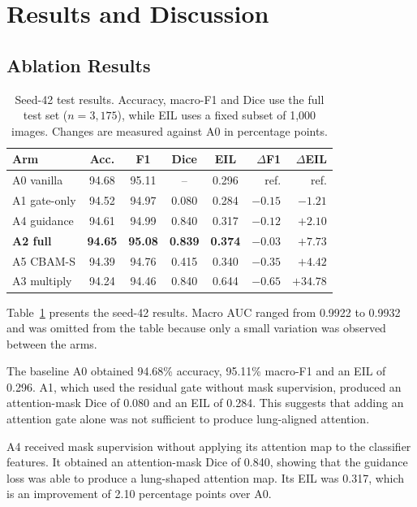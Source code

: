 \documentclass[sigconf,screen,nonacm]{acmart}
\begin{document}
\section{Results and Discussion}

\subsection{Ablation Results}

\begin{table}[t]
\centering
\footnotesize
\setlength{\tabcolsep}{3pt}
\caption{Seed-42 test results. Accuracy, macro-F1 and Dice use the
full test set ($n=3{,}175$), while EIL uses a fixed subset of 1,000
images. Changes are measured against A0 in percentage points.}
\label{tab:results}

\begin{tabular}{@{}lccccrr@{}}
\toprule
Arm & Acc. & F1 & Dice & EIL & $\Delta$F1 & $\Delta$EIL \\
\midrule
A0 vanilla & 94.68 & 95.11 & -- & 0.296 & ref. & ref. \\
A1 gate-only & 94.52 & 94.97 & 0.080 & 0.284 & $-0.15$ & $-1.21$ \\
A4 guidance & 94.61 & 94.99 & 0.840 & 0.317 & $-0.12$ & $+2.10$ \\
\textbf{A2 full} & \textbf{94.65} & \textbf{95.08}
& \textbf{0.839} & \textbf{0.374}
& \textbf{$-0.03$} & \textbf{$+7.73$} \\
A5 CBAM-S & 94.39 & 94.76 & 0.415 & 0.340 & $-0.35$ & $+4.42$ \\
A3 multiply & 94.24 & 94.46 & 0.840 & 0.644 & $-0.65$ & $+34.78$ \\
\bottomrule
\end{tabular}
\end{table}

Table~\ref{tab:results} presents the seed-42 results. Macro AUC ranged from 0.9922 to 0.9932 and was omitted from the table because only a small variation was observed between the arms.

The baseline A0 obtained 94.68\% accuracy, 95.11\% macro-F1 and an EIL of 0.296. A1, which used the residual gate without mask supervision, produced an attention-mask Dice of 0.080 and an EIL of 0.284. This suggests that adding an attention gate alone was not sufficient to produce lung-aligned attention.

A4 received mask supervision without applying its attention map to the classifier features. It obtained an attention-mask Dice of 0.840, showing that the guidance loss was able to produce a lung-shaped attention map. Its EIL was 0.317, which is an improvement of 2.10 percentage points over A0.
\end{document}
